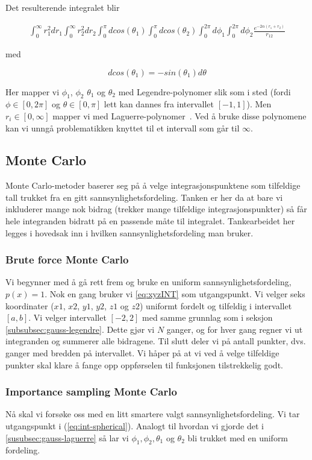 \documentclass[11pt]{article}
\begin{document}
Det resulterende integralet blir

\begin{align}
\int_{0}^{\infty} r_1^2 dr_1 \int_{0}^{\infty} r_2^2 dr_2
\int_{0}^{\pi} dcos(\theta_1) \int_{0}^{\pi} dcos(\theta_2)
\int_{0}^{2\pi} d\phi_1 \int_{0}^{2\pi} d\phi_2 \frac{e^{-2\alpha (r_1+r_2)}}{r_{12}}\label{eq:int-spherical}
\end{align}

med

\[
dcos(\theta_1) = -sin(\theta_1)d\theta
\]

Her mapper vi $\phi_1$, $\phi_2$ $\theta_1$ og $\theta_2$ med
Legendre-polynomer slik som i sted (fordi $\phi\in[0,2\pi]$ og
$\theta\in[0,\pi]$ lett kan dannes fra intervallet $[-1,1]$).
Men $ r_i \in [0, \infty] $ mapper vi med
Laguerre-polynomer~\cite{Lecture-notes}. Ved å bruke disse polynomene
kan vi unngå problematikken knyttet til et intervall som går til $\infty$.


\subsection{Monte Carlo}
\label{subsec:monte-carlo}
Monte Carlo-metoder baserer seg på å velge integrasjonspunktene som
tilfeldige tall trukket fra en gitt sannsynlighetsfordeling. Tanken er
her da at bare vi inkluderer mange nok bidrag (trekker mange
tilfeldige integrasjonspunkter) så får hele integranden bidratt på en
passende måte til integralet. Tankearbeidet her legges i hovedsak inn
i hvilken sannsynlighetsfordeling man bruker.

\subsubsection{Brute force Monte Carlo}
\label{subsubsec:monte-carlo-uniform}
Vi begynner med å gå rett frem og bruke en uniform
sannsynlighetsfordeling, $p(x) = 1$. Nok en gang bruker vi
\eqref{eq:xyzINT} som utgangspunkt. Vi velger seks koordinater ($x1$,
$x2$, $y1$, $y2$, $z1$ og $z2$) uniformt fordelt og tilfeldig i
intervallet $[a,b]$. Vi velger intervallet $[-2,2]$ med samme grunnlag
som i seksjon \ref{subsubsec:gauss-legendre}. Dette gjør vi $N$ ganger, og for hver gang regner
vi ut integranden og summerer alle bidragene. Til slutt deler vi på
antall punkter, dvs. ganger med bredden på intervallet. Vi håper på
at vi ved å velge tilfeldige punkter skal klare å fange opp
oppførselen til funksjonen tilstrekkelig godt.

\subsubsection{Importance sampling Monte Carlo}
\label{susubsec:monte-carlo-importance-sampling}
Nå skal vi forsøke oss med en litt smartere valgt
sannsynlighetsfordeling. Vi tar utgangspunkt i
(\ref{eq:int-spherical}). Analogt til hvordan vi gjorde det i
\ref{susubsec:gauss-laguerre} så lar vi $\phi_1,\phi_2,\theta_1$ og
$\theta_2$ bli trukket med en uniform fordeling.
\end{document}
